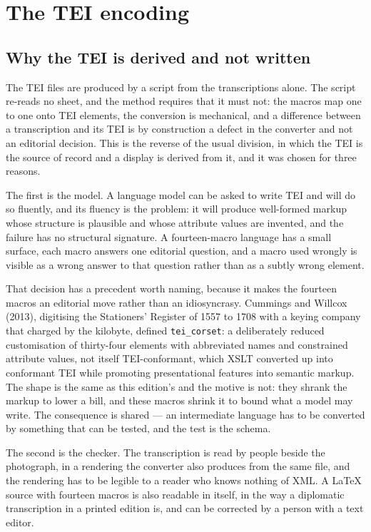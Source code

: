 \documentclass[11pt]{article}
\begin{document}
\section{The TEI encoding}

\subsection{Why the TEI is derived and not written}

The TEI files are produced by a script from the transcriptions alone. The script re-reads no sheet, and the method requires that it must not: the macros map one to one onto TEI elements, the conversion is mechanical, and a difference between a transcription and its TEI is by construction a defect in the converter and not an editorial decision. This is the reverse of the usual division, in which the TEI is the source of record and a display is derived from it, and it was chosen for three reasons.

The first is the model. A language model can be asked to write TEI and will do so fluently, and its fluency is the problem: it will produce well-formed markup whose structure is plausible and whose attribute values are invented, and the failure has no structural signature. A fourteen-macro language has a small surface, each macro answers one editorial question, and a macro used wrongly is visible as a wrong answer to that question rather than as a subtly wrong element.

That decision has a precedent worth naming, because it makes the fourteen
macros an editorial move rather than an idiosyncrasy. Cummings and Willcox
(2013), digitising the Stationers' Register of 1557 to 1708 with a keying
company that charged by the kilobyte, defined \texttt{tei\_corset}: a
deliberately reduced customisation of thirty-four elements with abbreviated
names and constrained attribute values, not itself TEI-conformant, which XSLT
converted up into conformant TEI while promoting presentational features into
semantic markup. The shape is the same as this edition's and the motive is not:
they shrank the markup to lower a bill, and these macros shrink it to bound what
a model may write. The consequence is shared --- an intermediate language has to
be converted by something that can be tested, and the test is the schema.

The second is the checker. The transcription is read by people beside the photograph, in a rendering the converter also produces from the same file, and the rendering has to be legible to a reader who knows nothing of XML. A LaTeX source with fourteen macros is also readable in itself, in the way a diplomatic transcription in a printed edition is, and can be corrected by a person with a text editor.
\end{document}
